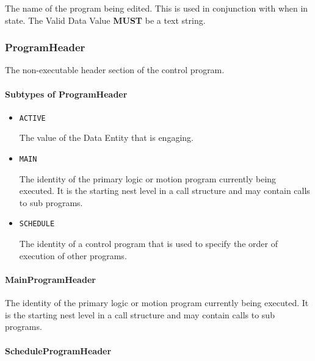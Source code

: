The name of the program being edited. 
 This is used in conjunction with  when in  state. 
 The \gls{Valid Data Value} \textbf{MUST} be a text string.


\subsubsection{ProgramHeader}
\label{sec:ProgramHeader}



The non-executable header section of the control program.


\paragraph{Subtypes of ProgramHeader}\mbox{}
\label{sec:Subtypes of ProgramHeader}

\begin{itemize}

\item \texttt{ACTIVE}


The value of the \gls{Data Entity} that is engaging.

\item \texttt{MAIN}


The identity of the primary logic or motion program currently being executed. It is the starting nest level in a call structure and may contain calls to sub programs.

\item \texttt{SCHEDULE}


The identity of a control program that is used to specify the order of execution of other programs.


\end{itemize}

\paragraph{MainProgramHeader}\mbox{}
\label{sec:MainProgramHeader}


The identity of the primary logic or motion program currently being executed. It is the starting nest level in a call structure and may contain calls to sub programs.


\paragraph{ScheduleProgramHeader}\mbox{}
\label{sec:ScheduleProgramHeader}


